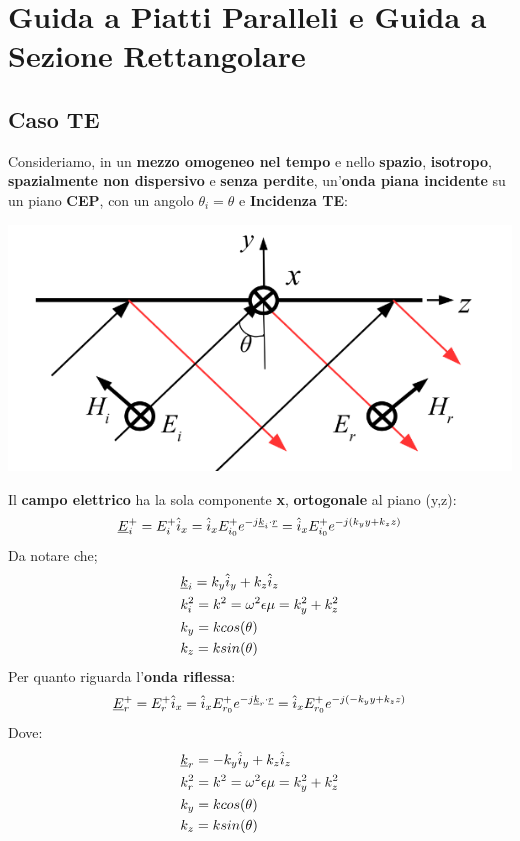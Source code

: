 \chapter{Guida a Piatti Paralleli e Guida a Sezione Rettangolare}
\section{Caso TE}
Consideriamo, in un \textbf{mezzo omogeneo nel tempo} e nello \textbf{spazio}, \textbf{isotropo}, \textbf{spazialmente non dispersivo} e \textbf{senza perdite}, un'\textbf{onda piana incidente} su un piano \textbf{CEP}, con un angolo $\theta_i = \theta$ e \textbf{Incidenza TE}:
\begin{center}
    \includegraphics[width=.6\textwidth]{Images/figure42.png}
\end{center}
Il \textbf{campo elettrico} ha la sola componente \textbf{x}, \textbf{ortogonale} al piano (y,z):
\begin{equation*}
    \underline{E}^+_i = E^+_i \hat{i}_x = \hat{i}_x E^+_{i_0} e^{-j\underline{k}_i \cdot \underline{r}} = \hat{i}_x E^+_{i_0} e^{-j(k_y y + k_z z)}
\end{equation*}
Da notare che;
\begin{equation*}
    \begin{aligned}
    &\underline{k}_i = k_y \hat{i}_y + k_z \hat{i}_z\\
    &k_i^2 = k^2 = \omega^2\epsilon \mu = k^2_y +k^2_z\\
    &k_y = k cos(\theta)\\
    &k_z = k sin(\theta)
    \end{aligned}
\end{equation*}
Per quanto riguarda l'\textbf{onda riflessa}:
\begin{equation*}
    \underline{E}^+_r = E^+_r \hat{i}_x = \hat{i}_x E^+_{r_0} e^{-j\underline{k}_r \cdot \underline{r}} = \hat{i}_x E^+_{r_0} e^{-j(-k_y y + k_z z)}
\end{equation*}
Dove:
\begin{equation*}
    \begin{aligned}
    &\underline{k}_r = - k_y \hat{i}_y + k_z \hat{i}_z\\
    &k_r^2 = k^2 = \omega^2\epsilon \mu =  k^2_y +k^2_z\\
    &k_y = k cos(\theta)\\
    &k_z = k sin(\theta)
    \end{aligned}
\end{equation*}
